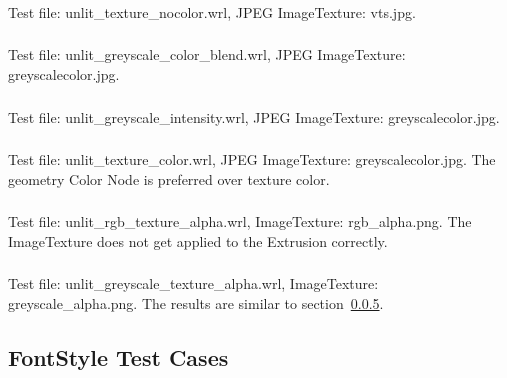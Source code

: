 \subsubsection{\AppGa\AppGb}
\label{sec:unlit-texture-nocolor}
Test file: unlit\_texture\_nocolor.wrl, JPEG ImageTexture: vts.jpg.\newline

\subsubsection{\AppHa\AppHb}
Test file: unlit\_greyscale\_color\_blend.wrl, JPEG ImageTexture:
greyscalecolor.jpg.\newline

\subsubsection{\AppIa\AppIb}
Test file: unlit\_greyscale\_intensity.wrl, JPEG ImageTexture:
greyscalecolor.jpg.\newline

\subsubsection{\AppJa\AppJb}
Test file: unlit\_texture\_color.wrl, JPEG ImageTexture:
greyscalecolor.jpg.\newline
The geometry Color Node is preferred over texture color.

\subsubsection{\AppKa\AppKb}
\label{sec:unlit-rgb-texture}
Test file: unlit\_rgb\_texture\_alpha.wrl, ImageTexture:
rgb\_alpha.png.\newline
The ImageTexture does not get applied to the Extrusion correctly.

\subsubsection{\AppLa\AppLb}
Test file: unlit\_greyscale\_texture\_alpha.wrl, ImageTexture:
greyscale\_alpha.png.\newline
The results are similar to section~\ref{sec:unlit-rgb-texture}.

\subsection{FontStyle Test Cases}

